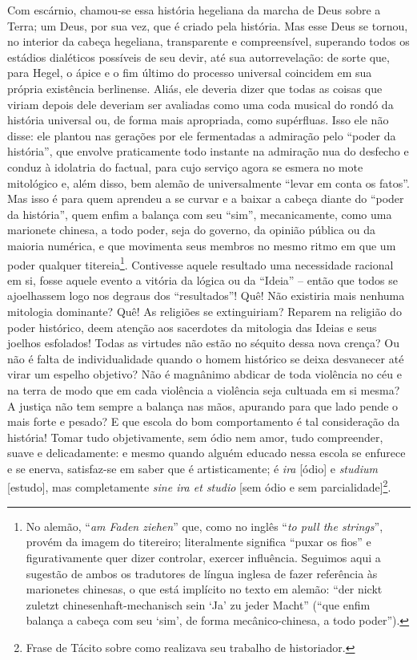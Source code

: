 Com escárnio, chamou-se essa história hegeliana da marcha de Deus sobre
a Terra; um Deus, por sua vez, que é criado pela história. Mas esse Deus
se tornou, no interior da cabeça hegeliana, transparente e
compreensível, superando todos os estádios dialéticos possíveis de seu
devir, até sua autorrevelação: de sorte que, para Hegel, o ápice e o fim
último do processo universal coincidem em sua própria existência
berlinense. \label{existenciaberlinense} Aliás, ele deveria dizer que todas as coisas que viriam
depois dele deveriam ser avaliadas como uma coda musical do rondó da
história universal ou, de forma mais apropriada, como supérfluas. Isso
ele não disse: ele plantou nas gerações por ele fermentadas a admiração
pelo ``poder da história'', que envolve praticamente todo instante na
admiração nua do desfecho e conduz à idolatria do factual, para cujo
serviço agora se esmera no mote mitológico e, além disso, bem alemão de
universalmente ``levar em conta os fatos''. Mas isso é para quem
aprendeu a se curvar e a baixar a cabeça diante do ``poder da
história'', quem enfim a balança com seu ``sim'', mecanicamente, como
uma marionete chinesa, a todo poder, seja do governo, da opinião pública
ou da maioria numérica, e que movimenta seus membros no mesmo ritmo em
que um poder qualquer titereia\footnote{No alemão, ``\emph{am Faden
  ziehen}'' que, como no inglês ``\emph{to pull the strings}'', provém
  da imagem do titereiro; literalmente significa ``puxar os fios'' e
  figurativamente quer dizer controlar, exercer influência. Seguimos
  aqui a sugestão de ambos os tradutores de língua inglesa de fazer
  referência às marionetes chinesas, o que está implícito no texto em
  alemão: ``der nickt zuletzt chinesenhaft-mechanisch sein `Ja' zu jeder
  Macht'' (``que enfim balança a cabeça com seu `sim', de forma
  mecânico-chinesa, a todo poder'').}. Contivesse aquele resultado uma
necessidade racional em si, fosse aquele evento a vitória da lógica ou
da ``Ideia'' -- então que todos se ajoelhassem logo nos degraus dos
``resultados''! Quê! Não existiria mais nenhuma mitologia dominante?
Quê! As religiões se extinguiriam? Reparem na religião do poder
histórico, deem atenção aos sacerdotes da mitologia das Ideias e seus
joelhos esfolados! Todas as virtudes não estão no séquito dessa nova
crença? Ou não é falta de individualidade quando o homem histórico se
deixa desvanecer até virar um espelho objetivo? Não é magnânimo abdicar
de toda violência no céu e na terra de modo que em cada violência a
violência seja cultuada em si mesma? A justiça não tem sempre a balança
nas mãos, apurando para que lado pende o mais forte e pesado? E que
escola do bom comportamento é tal consideração da história! Tomar tudo
objetivamente, sem ódio nem amor, tudo compreender, suave e
delicadamente: e mesmo quando alguém educado nessa escola se enfurece e
se enerva, satisfaz-se em saber que é artisticamente; é \emph{ira}
{[}ódio{]} e \emph{studium} {[}estudo{]}, mas completamente \emph{sine
ira et studio} {[}sem ódio e sem parcialidade{]}\footnote{Frase de
  Tácito sobre como realizava seu trabalho de historiador.}.

